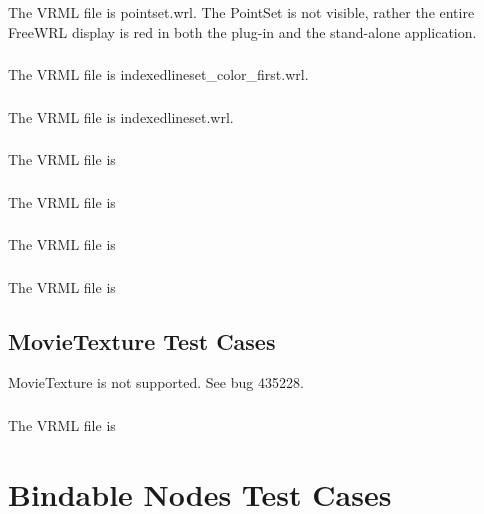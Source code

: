 \documentclass[12pt,letterpaper]{article}
\newcounter{testCaseCtr}
\newcommand{\resetTestCase}{\setcounter{testCaseCtr}{1}}
\begin{document}
\subsubsection{}
The VRML file is pointset.wrl.\newline
The PointSet is not visible, rather the entire FreeWRL display is red in both the plug-in and
the stand-alone application.

\subsubsection{}
The VRML file is indexedlineset\_color\_first.wrl.

\subsubsection{}
The VRML file is indexedlineset.wrl.\newline

\subsubsection{}
The VRML file is

\subsubsection{}
The VRML file is

\subsubsection{}
The VRML file is

\subsubsection{}
The VRML file is

\subsection{MovieTexture Test Cases}
MovieTexture is not supported. See bug 435228.

\subsubsection{}
The VRML file is 

\section{Bindable Nodes Test Cases}
\resetTestCase
\end{document}
